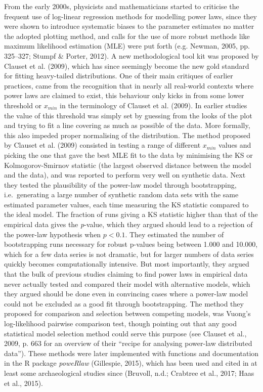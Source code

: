 \documentclass[
  12pt,
]{book}
\begin{document}
From the early 2000s, physicists and mathematicians started to criticise the frequent use of log-linear regression methods for modelling power laws, since they were shown to introduce systematic biases to the parameter estimates no matter the adopted plotting method, and calls for the use of more robust methods like maximum likelihood estimation (MLE) were put forth (e.g. Newman, 2005, pp. 325--327; Stumpf \& Porter, 2012). A new methodological tool kit was proposed by Clauset et al. (2009), which has since seemingly become the new gold standard for fitting heavy-tailed distributions. One of their main critiques of earlier practices, came from the recognition that in nearly all real-world contexts where power laws are claimed to exist, this behaviour only kicks in from some lower threshold or \(x_{min}\) in the terminology of Clauset et al. (2009). In earlier studies the value of this threshold was simply set by guessing from the looks of the plot and trying to fit a line covering as much as possible of the data. More formally, this also impeded proper normalising of the distribution. The method proposed by Clauset et al. (2009) consisted in testing a range of different \(x_{min}\) values and picking the one that gave the best MLE fit to the data by minimising the KS or Kolmogorov-Smirnov statistic (the largest observed distance between the model and the data), and was reported to perform very well on synthetic data. Next they tested the plausibility of the power-law model through bootstrapping, i.e.~generating a large number of synthetic random data sets with the same estimated parameter values, each time measuring the KS statistic compared to the ideal model. The fraction of runs giving a KS statistic higher than that of the empirical data gives the \emph{p}-value, which they argued should lead to a rejection of the power-law hypothesis when \(p < 0.1\). They estimated the number of bootstrapping runs necessary for robust p-values being between 1.000 and 10.000, which for a few data series is not dramatic, but for larger numbers of data series quickly becomes computationally intensive. But most importantly, they argued that the bulk of previous studies claiming to find power laws in empirical data never actually tested and compared their model with alternative models, which they argued should be done even in convincing cases where a power-law model could not be excluded as a good fit through bootstrapping. The method they proposed for comparison and selection between competing models, was Vuong's log-likelihood pairwise comparison test, though pointing out that any good statistical model selection method could serve this purpose (see Clauset et al., 2009, p. 663 for an overview of their ``recipe for analysing power-law distributed data''). These methods were later implemented with functions and documentation in the R package \emph{poweRlaw} (Gillespie, 2015), which has been used and cited in at least some archaeological studies since (Bruvoll, n.d.; Crabtree et al., 2017; Haas et al., 2015).
\end{document}
